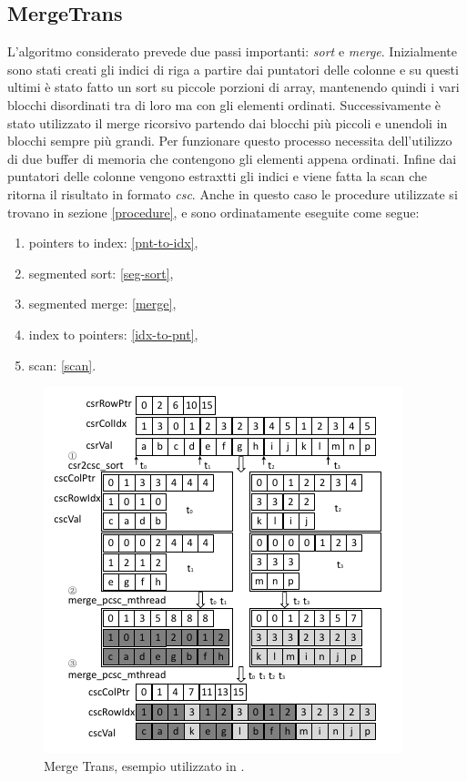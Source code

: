 \documentclass[]{IEEEtran}
\begin{document}
	\subsection{MergeTrans}
	L'algoritmo considerato prevede due passi importanti: \textit{sort} e \textit{merge}.
	Inizialmente sono stati creati gli indici di riga a partire dai puntatori delle colonne e su questi ultimi è stato fatto un sort su piccole porzioni di array, mantenendo quindi i vari blocchi disordinati tra di loro ma con gli elementi ordinati. Successivamente è stato utilizzato il merge ricorsivo partendo dai blocchi più piccoli e unendoli in blocchi sempre più grandi. Per funzionare questo processo necessita dell'utilizzo di due buffer di memoria che contengono gli elementi appena ordinati. Infine dai puntatori delle colonne vengono estraxtti gli indici e viene fatta la scan che ritorna il risultato in formato \textit{csc}. \newline
	Anche in questo caso le procedure utilizzate si trovano in sezione \ref{procedure}, e sono ordinatamente eseguite come segue:
	\begin{enumerate}
		\item pointers to index: \ref{pnt-to-idx},
		\item segmented sort: \ref{seg-sort},
		\item segmented merge: \ref{merge},
		\item index to pointers: \ref{idx-to-pnt},
		\item scan: \ref{scan}.
	\end{enumerate}
	
	\begin{figure}[H]
		\includegraphics[scale=0.6]{mergetrans.png}
		\caption{Merge Trans, esempio utilizzato in \cite{parallelTrans}.}
		\label{mergetrans}
	\end{figure}
	







		


\newpage
\mbox{}
\end{document}
